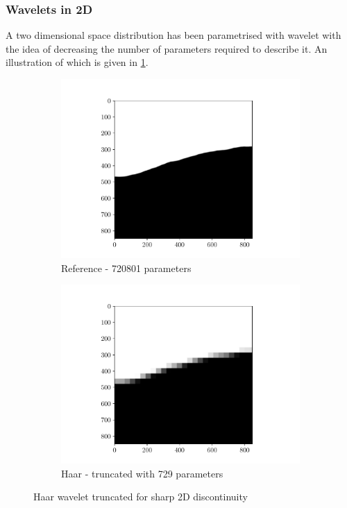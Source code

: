 \subsubsection{Wavelets in 2D}
A two dimensional space distribution has been parametrised with wavelet with the idea of decreasing the number of parameters required to describe it. An illustration of which is given in \cref{Wavelet_2D}.
\begin{figure}[hbpt!]
\begin{subfigure}[t]{0.5\linewidth}
    \centering
    \includegraphics[width=\linewidth]{Figures/2D_ref.pdf}
    \caption{Reference - 720801 parameters}
\end{subfigure}
  \begin{subfigure}[t]{0.5\linewidth}
    \centering
    \includegraphics[width=\linewidth]{Figures/2D_comp_haar.pdf}
    \caption{Haar - truncated with 729 parameters}
\end{subfigure}  
\caption{Haar wavelet truncated for sharp 2D discontinuity}
    \label{Wavelet_2D}
\end{figure}

